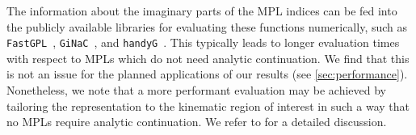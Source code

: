 \smallskip

The information about the imaginary parts of the \ac{MPL} indices can be fed into the publicly available libraries for evaluating these functions numerically, such as \texttt{FastGPL}~\cite{Wang:2021imw}, \texttt{GiNaC}~\cite{Bauer:2000cp,Vollinga:2004sn}, and \texttt{handyG}~\cite{Naterop:2019xaf}. This typically leads to longer evaluation times with respect to \acp{MPL} which do not need analytic continuation. We find that this is not an issue for the planned applications of our results (see \cref{sec:performance}). Nonetheless, we note that a more performant evaluation may be achieved by tailoring the representation to the kinematic region of interest in such a way that no \acp{MPL} require analytic continuation. We refer to  for a detailed discussion. 